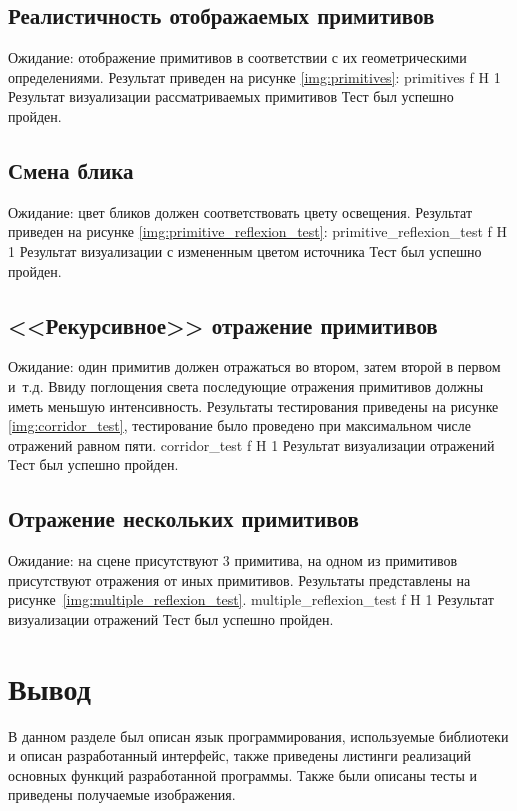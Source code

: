 \subsection{Реалистичность отображаемых примитивов}
Ожидание: отображение примитивов  в соответствии с их геометрическими определениями.
Результат приведен на рисунке \ref{img:primitives}:
{primitives} %
{f} %
{H} %
{1\textwidth} %
{Результат визуализации рассматриваемых примитивов} %
Тест был успешно пройден.

\subsection{Смена блика}
Ожидание: цвет бликов должен соответствовать цвету освещения.
Результат приведен на рисунке \ref{img:primitive_reflexion_test}:
{primitive_reflexion_test} %
{f} %
{H} %
{1\textwidth} %
{Результат визуализации с измененным цветом источника} %
Тест был успешно пройден.

\subsection{<<Рекурсивное>> отражение примитивов}
Ожидание: один примитив должен отражаться во втором, затем второй в первом и~т.д. Ввиду поглощения света последующие отражения примитивов должны иметь меньшую интенсивность. Результаты тестирования приведены на рисунке \ref{img:corridor_test}, тестирование было проведено при максимальном числе отражений равном пяти.
{corridor_test} %
{f} %
{H} %
{1\textwidth} %
{Результат визуализации отражений} %
Тест был успешно пройден.

\subsection{Отражение нескольких примитивов}
Ожидание: на сцене присутствуют 3 примитива, на одном из примитивов  присутствуют отражения от иных примитивов. Результаты представлены на рисунке~\ref{img:multiple_reflexion_test}.
{multiple_reflexion_test} %
{f} %
{H} %
{1\textwidth} %
{Результат визуализации отражений} %
Тест был успешно пройден.


\section*{Вывод}

В данном разделе был описан язык программирования, используемые библиотеки и описан разработанный интерфейс, также приведены листинги реализаций основных функций разработанной программы. Также были описаны тесты и приведены получаемые изображения.









